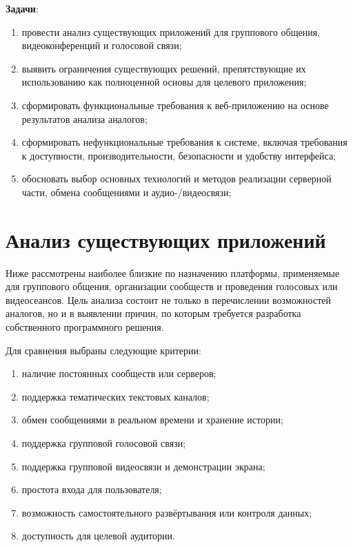 \documentclass[a4paper,12pt]{extarticle}
\begin{document}
\textbf{Задачи}:
\begin{enumerate}
    \item провести анализ существующих приложений для группового общения, видеоконференций и голосовой связи;
    \item выявить ограничения существующих решений, препятствующие их использованию как полноценной основы для целевого приложения;
    \item сформировать функциональные требования к веб-приложению на основе результатов анализа аналогов;
    \item сформировать нефункциональные требования к системе, включая требования к доступности, производительности, безопасности и удобству интерфейса;
    \item обосновать выбор основных технологий и методов реализации серверной части, обмена сообщениями и аудио-/видеосвязи;
\end{enumerate}

\newpage

\section{Анализ существующих приложений}

Ниже рассмотрены наиболее близкие по назначению платформы, применяемые для группового общения, организации сообществ и проведения голосовых или видеосеансов. Цель анализа состоит не только в перечислении возможностей аналогов, но и в выявлении причин, по которым требуется разработка собственного программного решения.

Для сравнения выбраны следующие критерии:
\begin{enumerate}
    \item наличие постоянных сообществ или серверов;
    \item поддержка тематических текстовых каналов;
    \item обмен сообщениями в реальном времени и хранение истории;
    \item поддержка групповой голосовой связи;
    \item поддержка групповой видеосвязи и демонстрации экрана;
    \item простота входа для пользователя;
    \item возможность самостоятельного развёртывания или контроля данных;
    \item доступность для целевой аудитории.
\end{enumerate}
\end{document}
